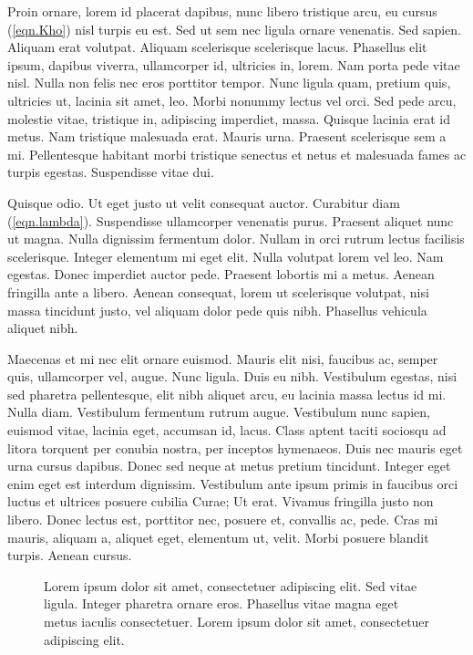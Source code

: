 \documentclass[nochapterpage,bigchapter,linedtoc,longdoc,colorback,accentcolor=tud3a]{tudreport}
\begin{document}
    Proin ornare, lorem id placerat dapibus, nunc libero tristique arcu, eu cursus (\ref{eqn.Kho}) nisl turpis eu est. Sed ut sem nec ligula ornare venenatis. Sed sapien. Aliquam erat volutpat. Aliquam scelerisque scelerisque lacus. Phasellus elit ipsum, dapibus viverra, ullamcorper id, ultricies in, lorem. Nam porta pede vitae nisl. Nulla non felis nec eros porttitor tempor. Nunc ligula quam, pretium quis, ultricies ut, lacinia sit amet, leo. Morbi nonummy lectus vel orci. Sed pede arcu, molestie vitae, tristique in, adipiscing imperdiet, massa. Quisque lacinia erat id metus. Nam tristique malesuada erat. Mauris urna. Praesent scelerisque sem a mi. Pellentesque habitant morbi tristique senectus et netus et malesuada fames ac turpis egestas. Suspendisse vitae dui.

    Quisque odio. Ut eget justo ut velit consequat auctor. Curabitur diam (\ref{eqn.lambda}). Suspendisse ullamcorper venenatis purus. Praesent aliquet nunc ut magna. Nulla dignissim fermentum dolor. Nullam in orci rutrum lectus facilisis scelerisque. Integer elementum mi eget elit. Nulla volutpat lorem vel leo. Nam egestas. Donec imperdiet auctor pede. Praesent lobortis mi a metus. Aenean fringilla ante a libero. Aenean consequat, lorem ut scelerisque volutpat, nisi massa tincidunt justo, vel aliquam dolor pede quis nibh. Phasellus vehicula aliquet nibh.

    Maecenas et mi nec elit ornare euismod. Mauris elit nisi, faucibus ac, semper quis, ullamcorper vel, augue. Nunc ligula. Duis eu nibh. Vestibulum egestas, nisi sed pharetra pellentesque, elit nibh aliquet arcu, eu lacinia massa lectus id mi. Nulla diam. Vestibulum fermentum rutrum augue. Vestibulum nunc sapien, euismod vitae, lacinia eget, accumsan id, lacus. Class aptent taciti sociosqu ad litora torquent per conubia nostra, per inceptos hymenaeos. Duis nec mauris eget urna cursus dapibus. Donec sed neque at metus pretium tincidunt. Integer eget enim eget est interdum dignissim. Vestibulum ante ipsum primis in faucibus orci luctus et ultrices posuere cubilia Curae; Ut erat. Vivamus fringilla justo non libero. Donec lectus est, porttitor nec, posuere et, convallis ac, pede. Cras mi mauris, aliquam a, aliquet eget, elementum ut, velit. Morbi posuere blandit turpis. Aenean cursus.
             \begin{figure}
                 \centering
                 \caption[Lorem ipsum dolor sit amet]{Lorem ipsum dolor sit amet, consectetuer adipiscing elit. Sed vitae ligula. Integer pharetra ornare eros. Phasellus vitae magna eget metus iaculis consectetuer. Lorem ipsum dolor sit amet, consectetuer adipiscing elit.}
             \end{figure}
\end{document}
